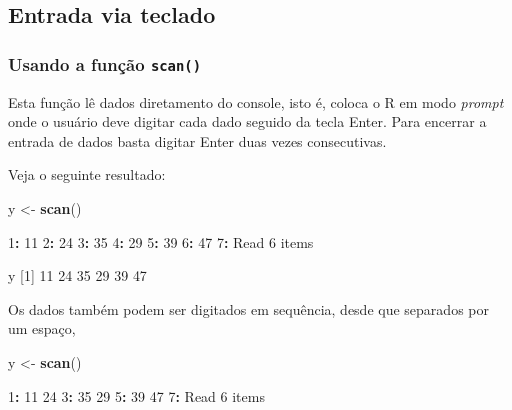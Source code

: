 \documentclass[10pt,a4paper]{book}
\newenvironment{Shaded}{\begin{snugshade}}{\end{snugshade}}
\newcommand{\KeywordTok}[1]{\textcolor[rgb]{0.13,0.29,0.53}{\textbf{#1}}}
\newcommand{\DecValTok}[1]{\textcolor[rgb]{0.00,0.00,0.81}{#1}}
\newcommand{\StringTok}[1]{\textcolor[rgb]{0.31,0.60,0.02}{#1}}
\newcommand{\OperatorTok}[1]{\textcolor[rgb]{0.81,0.36,0.00}{\textbf{#1}}}
\newcommand{\NormalTok}[1]{#1}
\begin{document}
\subsection{Entrada via teclado}\label{entrada-via-teclado}

\subsubsection{\texorpdfstring{Usando a função
\texttt{scan()}}{Usando a função scan()}}\label{usando-a-funuxe7uxe3o-scan}

Esta função lê dados diretamento do console, isto é, coloca o R em modo
\emph{prompt} onde o usuário deve digitar cada dado seguido da tecla
Enter. Para encerrar a entrada de dados basta digitar Enter duas vezes
consecutivas.

Veja o seguinte resultado:

\begin{Shaded}
\begin{Highlighting}[]
\NormalTok{y <-}\StringTok{ }\KeywordTok{scan}\NormalTok{()}

\DecValTok{1}\OperatorTok{:}\StringTok{ }\DecValTok{11}
\DecValTok{2}\OperatorTok{:}\StringTok{ }\DecValTok{24}
\DecValTok{3}\OperatorTok{:}\StringTok{ }\DecValTok{35}
\DecValTok{4}\OperatorTok{:}\StringTok{ }\DecValTok{29}
\DecValTok{5}\OperatorTok{:}\StringTok{ }\DecValTok{39}
\DecValTok{6}\OperatorTok{:}\StringTok{ }\DecValTok{47}
\DecValTok{7}\OperatorTok{:}
\NormalTok{Read }\DecValTok{6}\NormalTok{ items}
\end{Highlighting}
\end{Shaded}

\begin{Shaded}
\begin{Highlighting}[]
\NormalTok{y}
\NormalTok{[}\DecValTok{1}\NormalTok{] }\DecValTok{11} \DecValTok{24} \DecValTok{35} \DecValTok{29} \DecValTok{39} \DecValTok{47}
\end{Highlighting}
\end{Shaded}

Os dados também podem ser digitados em sequência, desde que separados
por um espaço,

\begin{Shaded}
\begin{Highlighting}[]
\NormalTok{y <-}\StringTok{ }\KeywordTok{scan}\NormalTok{()}

\DecValTok{1}\OperatorTok{:}\StringTok{ }\DecValTok{11} \DecValTok{24}
\DecValTok{3}\OperatorTok{:}\StringTok{ }\DecValTok{35} \DecValTok{29}
\DecValTok{5}\OperatorTok{:}\StringTok{ }\DecValTok{39} \DecValTok{47}
\DecValTok{7}\OperatorTok{:}
\NormalTok{Read }\DecValTok{6}\NormalTok{ items}
\end{Highlighting}
\end{Shaded}
\end{document}
